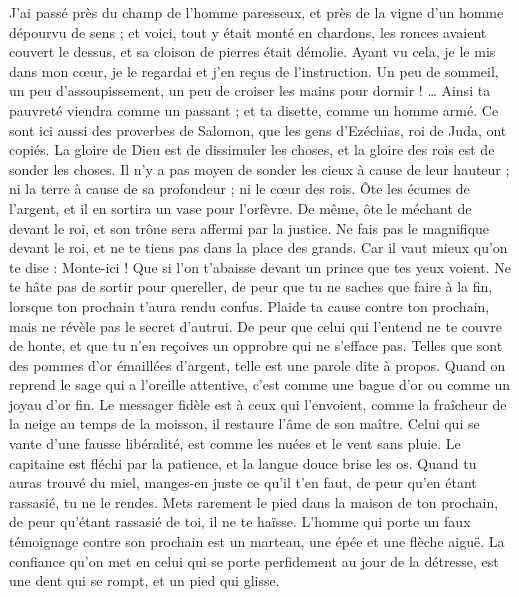 \begin{multicols}{2}
J'ai passé près du champ de l'homme paresseux, et près de la vigne d'un homme dépourvu de sens ;
et voici, tout y était monté en chardons, les ronces avaient couvert le dessus, et sa cloison de pierres était démolie.
Ayant vu cela, je le mis dans mon cœur, je le regardai et j'en reçus de l'instruction.
Un peu de sommeil, un peu d'assoupissement, un peu de croiser les mains pour dormir ! …
Ainsi ta pauvreté viendra comme un passant ; et ta disette, comme un homme armé.
\VerseOne{}Ce sont ici aussi des proverbes de Salomon, que les gens d'Ezéchias, roi de Juda, ont copiés.
La gloire de Dieu est de dissimuler les choses, et la gloire des rois est de sonder les choses.
Il n'y a pas moyen de sonder les cieux à cause de leur hauteur ; ni la terre à cause de sa profondeur ; ni le cœur des rois.
Ôte les écumes de l'argent, et il en sortira un vase pour l'orfèvre.
 De même, ôte le méchant de devant le roi, et son trône sera affermi par la justice.
Ne fais pas le magnifique devant le roi, et ne te tiens pas dans la place des grands.
Car il vaut mieux qu'on te dise : Monte-ici ! Que si l'on t'abaisse devant un prince que tes yeux voient.
Ne te hâte pas de sortir pour quereller, de peur que tu ne saches que faire à la fin, lorsque ton prochain t'aura rendu confus.
Plaide ta cause contre ton prochain, mais ne révèle pas le secret d'autrui.
De peur que celui qui l'entend ne te couvre de honte, et que tu n'en reçoives un opprobre qui ne s'efface pas.
Telles que sont des pommes d'or émaillées d'argent, telle est une parole dite à propos.
Quand on reprend le sage qui a l'oreille attentive, c'est comme une bague d'or ou comme un joyau d'or fin.
Le messager fidèle est à ceux qui l'envoient, comme la fraîcheur de la neige au temps de la moisson, il restaure l'âme de son maître.
Celui qui se vante d'une fausse libéralité, est comme les nuées et le vent sans pluie.
Le capitaine est fléchi par la patience, et la langue douce brise les os.
Quand tu auras trouvé du miel, manges-en juste ce qu'il t'en faut, de peur qu'en étant rassasié, tu ne le rendes.
Mets rarement le pied dans la maison de ton prochain, de peur qu'étant rassasié de toi, il ne te haïsse.
L'homme qui porte un faux témoignage contre son prochain est un marteau, une épée et une flèche aiguë.
La confiance qu'on met en celui qui se porte perfidement au jour de la détresse, est une dent qui se rompt, et un pied qui glisse.

\end{multicols}
